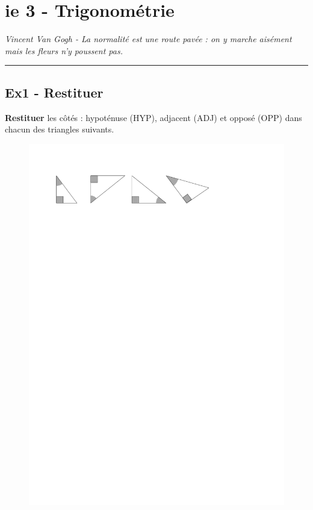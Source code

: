 \documentclass[12pt]{article}
\newcommand{\horrule}[1]{\rule{\linewidth}{#1}} %
\begin{document}

\newtheorem{Definition}{Définition}
\newtheorem{Theorem}{Théorème}
\newtheorem{Proposition}{Propriété}

\renewcommand{\labelitemi}{$\bullet$}
\renewcommand{\labelitemii}{$\circ$}

\setlength{\columnseprule}{1pt}

\section*{ie 3 - Trigonométrie}
\begin{center}
  \textit{Vincent Van Gogh - La normalité est une route pavée : on y marche aisément mais les fleurs n’y poussent pas.}
\end{center}
\horrule{2px}

\subsection*{Ex1 - Restituer}

\textbf{Restituer} les côtés : hypoténuse (HYP), adjacent (ADJ) et opposé (OPP) dans chacun des triangles suivants.

\begin{figure}[H]
  \centering
  \includegraphics[width=0.6 \linewidth]{4x2-trigonometrie/sources/trigo-ex1a.pdf}
\end{figure}
\end{document}
